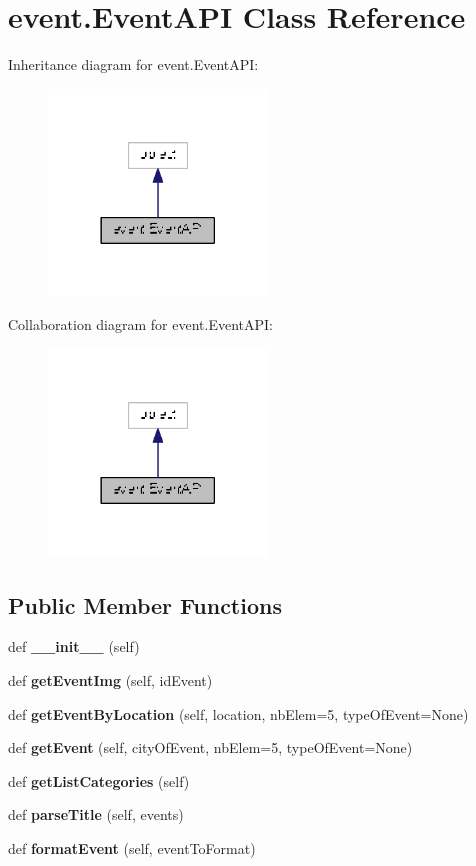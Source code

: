 \section{event.\+Event\+A\+PI Class Reference}
\label{classevent_1_1_event_a_p_i}


Inheritance diagram for event.\+Event\+A\+PI\+:
\nopagebreak
\begin{figure}[H]
\begin{center}
\leavevmode
\includegraphics[width=165pt]{classevent_1_1_event_a_p_i__inherit__graph}
\end{center}
\end{figure}


Collaboration diagram for event.\+Event\+A\+PI\+:
\nopagebreak
\begin{figure}[H]
\begin{center}
\leavevmode
\includegraphics[width=165pt]{classevent_1_1_event_a_p_i__coll__graph}
\end{center}
\end{figure}
\subsection*{Public Member Functions}
\begin{DoxyCompactItemize}
\item 
def {\bf \+\_\+\+\_\+init\+\_\+\+\_\+} (self)
\item 
def {\bf get\+Event\+Img} (self, id\+Event)
\item 
def {\bf get\+Event\+By\+Location} (self, location, nb\+Elem=\textquotesingle{}5\textquotesingle{}, type\+Of\+Event=None)
\item 
def {\bf get\+Event} (self, city\+Of\+Event, nb\+Elem=\textquotesingle{}5\textquotesingle{}, type\+Of\+Event=None)
\item 
def {\bf get\+List\+Categories} (self)
\item 
def {\bf parse\+Title} (self, events)
\item 
def {\bf format\+Event} (self, event\+To\+Format)
\end{DoxyCompactItemize}


